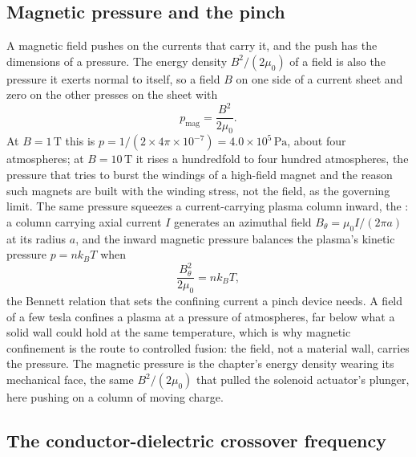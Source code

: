 \subsection{Magnetic pressure and the pinch}

A magnetic field pushes on the currents that carry it, and the push has the
dimensions of a pressure. The energy density $B^{2}/(2\mu_0)$ of a field is
also the pressure it exerts normal to itself, so a field $B$ on one side of
a current sheet and zero on the other presses on the sheet with
\[
p_{\text{mag}} = \frac{B^{2}}{2\mu_0}.
\]
At $B = 1\,\si{\tesla}$ this is $p = 1/(2\times 4\pi\times 10^{-7}) = 4.0
\times 10^{5}\,\si{\pascal}$, about four atmospheres; at $B = 10\,\si{
\tesla}$ it rises a hundredfold to four hundred atmospheres, the pressure
that tries to burst the windings of a high-field magnet and the reason such
magnets are built with the winding stress, not the field, as the governing
limit. The same pressure squeezes a current-carrying plasma column inward,
the : a column carrying axial current $I$ generates an
azimuthal field $B_\theta = \mu_0 I/(2\pi a)$ at its radius $a$, and the
inward magnetic pressure balances the plasma's kinetic pressure $p = n k_B
T$ when
\[
\frac{B_\theta^{2}}{2\mu_0} = n k_B T,
\]
the Bennett relation that sets the confining current a pinch device needs.
A field of a few tesla confines a plasma at a pressure of atmospheres, far
below what a solid wall could hold at the same temperature, which is why
magnetic confinement is the route to controlled fusion: the field, not a
material wall, carries the pressure. The magnetic pressure is the
chapter's energy density wearing its mechanical face, the same $B^{2}/
(2\mu_0)$ that pulled the solenoid actuator's plunger, here pushing on a
column of moving charge.

\subsection{The conductor-dielectric crossover frequency}

